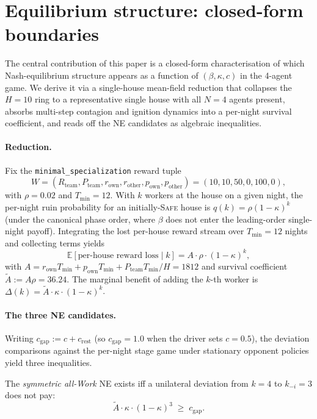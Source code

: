 \documentclass{anvil-paper}
\begin{document}
\section{Equilibrium structure: closed-form boundaries}
\label{sec:ne}

The central contribution of this paper is a closed-form characterisation of
which Nash-equilibrium structure appears as a function of $(\beta,\kappa,c)$
in the 4-agent game. We derive it via a single-house mean-field reduction
that collapses the $H{=}10$ ring to a representative single house with all
$N{=}4$ agents present, absorbs multi-step contagion and ignition dynamics
into a per-night survival coefficient, and reads off the NE candidates as
algebraic inequalities.

\paragraph{Reduction.}
Fix the \texttt{minimal\_specialization} reward tuple
\[
  W = (R_{\text{team}},P_{\text{team}},r_{\text{own}},r_{\text{other}},
  p_{\text{own}},p_{\text{other}}) = (10,10,50,0,100,0),
\]
with $\rho{=}0.02$ and
$T_{\min}{=}12$. With $k$ workers at the house on a given night, the per-night
ruin probability for an initially-\textsc{Safe} house is
$q(k){=}\rho(1-\kappa)^k$ (under the canonical phase order, where $\beta$
does not enter the leading-order single-night payoff). Integrating the lost
per-house reward stream over $T_{\min}{=}12$ nights and collecting terms
yields
\[
  \mathbb{E}[\text{per-house reward loss}\mid k] = A\cdot\rho\cdot(1-\kappa)^k,
\]
with $A{=}r_{\text{own}}T_{\min}+p_{\text{own}}T_{\min}+P_{\text{team}}
T_{\min}/H{=}1812$ and survival coefficient
$\tilde A{:=}A\rho{=}36.24$. The marginal benefit of adding the $k$-th
worker is $\Delta(k){=}\tilde A\cdot\kappa\cdot(1-\kappa)^k$.

\paragraph{The three NE candidates.}
Writing $c_{\text{gap}}{:=}c+c_{\text{rest}}$ (so $c_{\text{gap}}{=}1.0$ when
the driver sets $c{=}0.5$), the deviation comparisons against the per-night
stage game under stationary opponent policies yield three inequalities.

The \emph{symmetric all-Work} NE exists iff a unilateral deviation from
$k{=}4$ to $k_{-i}{=}3$ does not pay:
\begin{equation}
  \tilde A\cdot\kappa\cdot(1-\kappa)^{3}\;\geq\;c_{\text{gap}}.
  \tag{S}\label{eq:S}
\end{equation}
\end{document}
